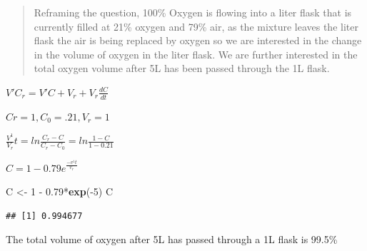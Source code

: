 \documentclass[]{article}
\newenvironment{Shaded}{\begin{snugshade}}{\end{snugshade}}
\newcommand{\KeywordTok}[1]{\textcolor[rgb]{0.13,0.29,0.53}{\textbf{{#1}}}}
\newcommand{\DecValTok}[1]{\textcolor[rgb]{0.00,0.00,0.81}{{#1}}}
\newcommand{\FloatTok}[1]{\textcolor[rgb]{0.00,0.00,0.81}{{#1}}}
\newcommand{\StringTok}[1]{\textcolor[rgb]{0.31,0.60,0.02}{{#1}}}
\newcommand{\NormalTok}[1]{{#1}}
\begin{document}
\begin{quote}
Reframing the question, 100\% Oxygen is flowing into a liter flask that
is currently filled at 21\% oxygen and 79\% air, as the mixture leaves
the liter flask the air is being replaced by oxygen so we are interested
in the change in the volume of oxygen in the liter flask. We are further
interested in the total oxygen volume after 5L has been passed through
the 1L flask.
\end{quote}

\(V'C_r = V'C + V_r + V_r \frac{dC}{dt}\)

\(Cr = 1, C_0 = .21, V_r = 1\)

\(\frac{V^1}{V_r}t = ln\frac{C_r-C}{C_r-C_0} = ln\frac{1-C}{1-0.21}\)

\(C = 1 - 0.79e^{\frac{-v^1t}{v_r}}\)

\begin{Shaded}
\begin{Highlighting}[]
\NormalTok{C <-}\StringTok{ }\DecValTok{1} \NormalTok{-}\StringTok{ }\FloatTok{0.79}\NormalTok{*}\KeywordTok{exp}\NormalTok{(-}\DecValTok{5}\NormalTok{)}
\NormalTok{C}
\end{Highlighting}
\end{Shaded}

\begin{verbatim}
## [1] 0.994677
\end{verbatim}

The total volume of oxygen after 5L has passed through a 1L flask is
99.5\%
\end{document}
